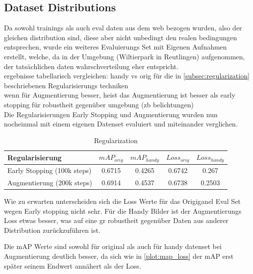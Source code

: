 \subsection{Dataset Distributions}\label{subsec:distributions}
Da sowohl trainings als auch eval daten aus dem web bezogen wurden,
also der gleichen distribution sind, diese aber nicht unbedingt 
den realen bedingungen entsprechen, wurde ein weiteres Evaluierungs 
Set mit Eigenen Aufnahmen erstellt, welche, da in der Umgebung 
(Wiltierpark in Reutlingen) aufgenommen, der tatsächlichen daten 
wahrschverteilung eher entspricht.
\\
ergebnisse tabellarisch vergleichen: handy vs orig für die in 
\ref{subsec:regularization} beschriebenen Regularisierungs techniken\\
wenn für Augmentierung besser, heist das Augmentierung ist besser als 
early stopping für robustheit gegenüber umgebung (zb belichtungen)
\\
Die Regularisierungen Early Stopping und Augmentierung wurden 
nun nocheinmal mit einem eigenen Datenset evaluiert und miteinander 
verglichen.


\begin{table}[htb]
    \centering
    \label{tab:regularization}
    \begin{tabular}{| l || c | c | c | c |} 
        \hline
        Regularisierung & $mAP_{orig}$ & $mAP_{handy}$ & $Loss_{orig}$ &  $Loss_{handy}$\\
        \hline
        Early Stopping (100k steps) & 0.6715 & 0.4265 & 0.6742 & 0.267\\
        \hline
        Augmentierung (200k steps) & 0.6914 & 0.4537 & 0.6738 & 0.2503\\ %
        \hline
    \end{tabular}        
    \caption{Regularization}
\end{table}

Wie zu erwarten unterscheiden sich die Loss Werte für das Origiganel 
Eval Set wegen Early stopping nicht sehr. Für die Handy Bilder ist 
der Augmentierungs Loss etwas besser, was auf eine gr robustheit 
gegenüber Daten aus anderer Distribution zurückzuführen ist.

Die mAP Werte sind sowohl für original als auch für handy datenset 
bei Augmentierung deutlich besser, da sich wie in \ref{plot:map_loss} 
der mAP erst später seinem Endwert annähert als der Loss.



